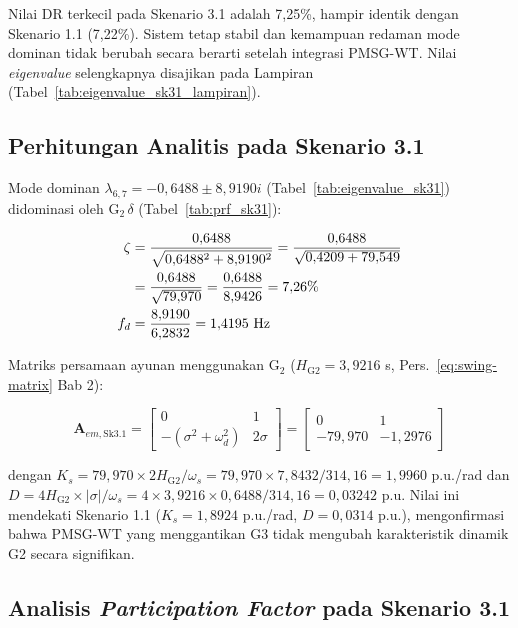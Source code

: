 Nilai DR terkecil pada Skenario 3.1 adalah 7,25\%, hampir identik dengan
Skenario 1.1 (7,22\%). Sistem tetap stabil dan kemampuan redaman mode dominan
tidak berubah secara berarti setelah integrasi PMSG-WT. Nilai
\textit{eigenvalue} selengkapnya disajikan pada Lampiran (Tabel~\ref{tab:eigenvalue_sk31_lampiran}).

\subsection{Perhitungan Analitis pada Skenario 3.1}

Mode dominan $\lambda_{6,7} = -0{,}6488 \pm 8{,}9190i$
(Tabel~\ref{tab:eigenvalue_sk31}) didominasi oleh G$_2\,\delta$
(Tabel~\ref{tab:prf_sk31}):

\begin{align}
    \zeta &= \frac{0{,}6488}{\sqrt{0{,}6488^2 + 8{,}9190^2}}
           = \frac{0{,}6488}{\sqrt{0{,}4209 + 79{,}549}} \notag \\
          &= \frac{0{,}6488}{\sqrt{79{,}970}}
           = \frac{0{,}6488}{8{,}9426} = 7{,}26\% \\
    f_d   &= \frac{8{,}9190}{6{,}2832} = 1{,}4195 \text{ Hz}
\end{align}

Matriks persamaan ayunan menggunakan G$_2$ ($H_{\text{G2}} = 3{,}9216$ s,
Pers.~\ref{eq:swing-matrix} Bab 2):

\begin{equation}
    \mathbf{A}_{em,\text{Sk3.1}} =
    \begin{bmatrix}
        0 & 1 \\[4pt]
        -(\sigma^2 + \omega_d^2) & 2\sigma
    \end{bmatrix}
    =
    \begin{bmatrix}
        0 & 1 \\[4pt]
        -79{,}970 & -1{,}2976
    \end{bmatrix}
    \label{eq:Aem_sk31}
\end{equation}

dengan $K_s = 79{,}970 \times 2H_{\text{G2}}/\omega_s = 79{,}970 \times
7{,}8432/314{,}16 = 1{,}9960$ p.u./rad dan $D = 4H_{\text{G2}}\times
|\sigma|/\omega_s = 4\times3{,}9216\times0{,}6488/314{,}16 = 0{,}03242$ p.u.
Nilai ini mendekati Skenario 1.1 ($K_s = 1{,}8924$ p.u./rad, $D = 0{,}0314$ p.u.),
mengonfirmasi bahwa PMSG-WT yang menggantikan G3 tidak mengubah karakteristik
dinamik G2 secara signifikan.

\subsection{Analisis \textit{Participation Factor} pada Skenario 3.1}

